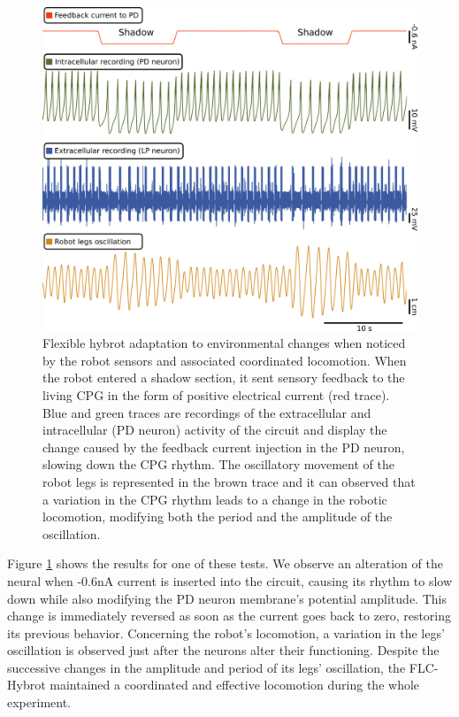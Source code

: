 \begin{figure}[hbt!]
	\begin{center}
		\includegraphics[width=0.8\linewidth]{./img/invariants/robot/robot_results_validation}
	\end{center}
	\caption{Flexible hybrot adaptation to environmental changes when noticed by the robot sensors and associated coordinated locomotion. When the robot entered a shadow section, it sent sensory feedback to the living CPG in the form of positive electrical current (red trace). Blue and green traces are recordings of the extracellular and intracellular (PD neuron) activity of the circuit and display the change caused by the feedback current injection in the PD neuron, slowing down the CPG rhythm. The oscillatory movement of the robot legs is represented in the brown trace and it can observed that a variation in the CPG rhythm leads to a change in the robotic locomotion, modifying both the period and the amplitude of the oscillation. 
	}
	\label{fig:robot_results_validation}
\end{figure}

Figure \ref{fig:robot_results_validation} shows the results for one of these tests. We observe an alteration of the neural when -0.6nA current is inserted into the circuit, causing its rhythm to slow down while also modifying the PD neuron membrane's potential amplitude. This change is immediately reversed as soon as the current goes back to zero, restoring its previous behavior. Concerning the robot's locomotion, a variation in the legs' oscillation is observed just after the neurons alter their functioning. Despite the successive changes in the amplitude and period of its legs' oscillation, the FLC-Hybrot maintained a coordinated and effective locomotion during the whole experiment. 


